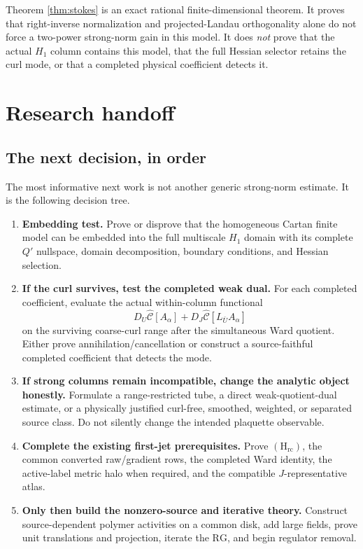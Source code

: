 \documentclass[11pt]{article}
\theoremstyle{definition}
\newcommand{\RG}{\mathrm{RG}}
\newcommand{\Hrc}{(\mathrm H_{\mathrm{rc}})}
\begin{document}
Theorem \ref{thm:stokes} is an exact rational finite-dimensional theorem.
It proves that right-inverse normalization and projected-Landau
orthogonality alone do not force a two-power strong-norm gain in this model.
It does \emph{not} prove that the actual \(H_1\) column contains this model,
that the full Hessian selector retains the curl mode, or that a completed
physical coefficient detects it.

\section{Research handoff}

\subsection{The next decision, in order}

The most informative next work is not another generic strong-norm estimate.
It is the following decision tree.

\begin{enumerate}
  \item \textbf{Embedding test.}
  Prove or disprove that the homogeneous Cartan finite model can be embedded
  into the full multiscale \(H_1\) domain with its complete \(Q'\) nullspace,
  domain decomposition, boundary conditions, and Hessian selection.

  \item \textbf{If the curl survives, test the completed weak dual.}
  For each completed coefficient, evaluate the actual within-column
  functional
  \[
  D_U\widehat{\mathcal C}[A_\alpha]
  +
  D_J\widehat{\mathcal C}[L_{\bar U}A_\alpha]
  \tag{7.1}
  \]
  on the surviving coarse-curl range after the simultaneous Ward quotient.
  Either prove annihilation/cancellation or construct a source-faithful
  completed coefficient that detects the mode.

  \item \textbf{If strong columns remain incompatible, change the analytic
  object honestly.}
  Formulate a range-restricted tube, a direct weak-quotient-dual estimate,
  or a physically justified curl-free, smoothed, weighted, or separated
  source class.  Do not silently change the intended plaquette observable.

  \item \textbf{Complete the existing first-jet prerequisites.}
  Prove \(\Hrc\), the common converted raw/gradient rows, the completed Ward
  identity, the active-label metric halo when required, and the compatible
  \(J\)-representative atlas.

  \item \textbf{Only then build the nonzero-source and iterative theory.}
  Construct source-dependent polymer activities on a common disk, add large
  fields, prove unit translations and projection, iterate the \(\RG\), and
  begin regulator removal.
\end{enumerate}
\end{document}
